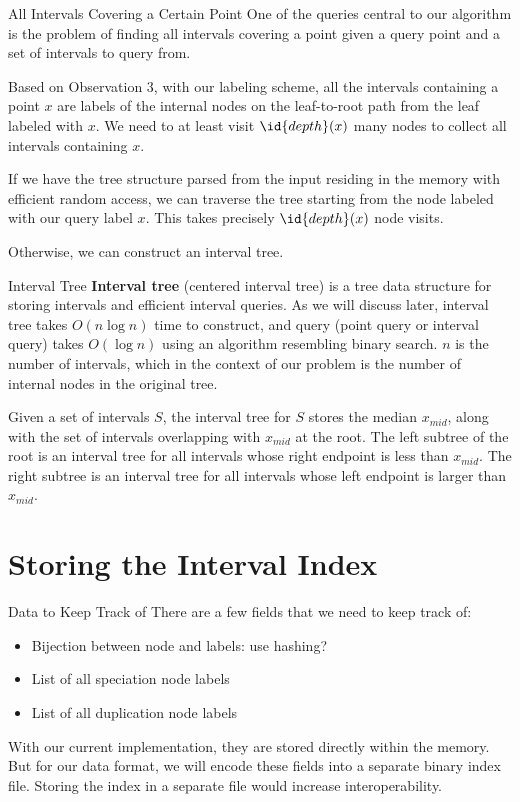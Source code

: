 \documentclass{beamer}
\begin{document}
\begin{frame}{All Intervals Covering a Certain Point}
    One of the queries central to our algorithm is the problem of finding all intervals covering a point given a query point and a set of intervals to query from.

    Based on Observation 3, with our labeling scheme, all the intervals containing a point $x$ are labels of the internal nodes on the leaf-to-root path from the leaf labeled with $x$. We need to at least visit $\id{depth}(x)$ many nodes to collect all intervals containing $x$.

    If we have the tree structure parsed from the input residing in the memory with efficient random access, we can traverse the tree starting from the node labeled with our query label $x$. This takes precisely $\id{depth}(x)$ node visits.

    Otherwise, we can construct an interval tree.
\end{frame}

\begin{frame}{Interval Tree}
    \textbf{Interval tree} (centered interval tree) is a tree data structure for storing intervals and efficient interval queries. As we will discuss later, interval tree takes $O(n \log n)$ time to construct, and query (point query or interval query) takes $O(\log n)$ using an algorithm resembling binary search. $n$ is the number of intervals, which in the context of our problem is the number of internal nodes in the original tree.

    Given a set of intervals $S$, the interval tree for $S$ stores the median $x_{mid}$, along with the set of intervals overlapping with $x_{mid}$ at the root. The left subtree of the root is an interval tree for all intervals whose right endpoint is less than $x_{mid}$. The right subtree is an interval tree for all intervals whose left endpoint is larger than $x_{mid}$.
\end{frame}

\section{Storing the Interval Index}

\begin{frame}{Data to Keep Track of}
    There are a few fields that we need to keep track of:
    \begin{itemize}
        \item Bijection between node and labels: use hashing?
        \item List of all speciation node labels
        \item List of all duplication node labels
    \end{itemize}
    With our current implementation, they are stored directly within the memory. But for our data format, we will encode these fields into a separate binary index file. Storing the index in a separate file would increase interoperability.
\end{frame}
\end{document}
